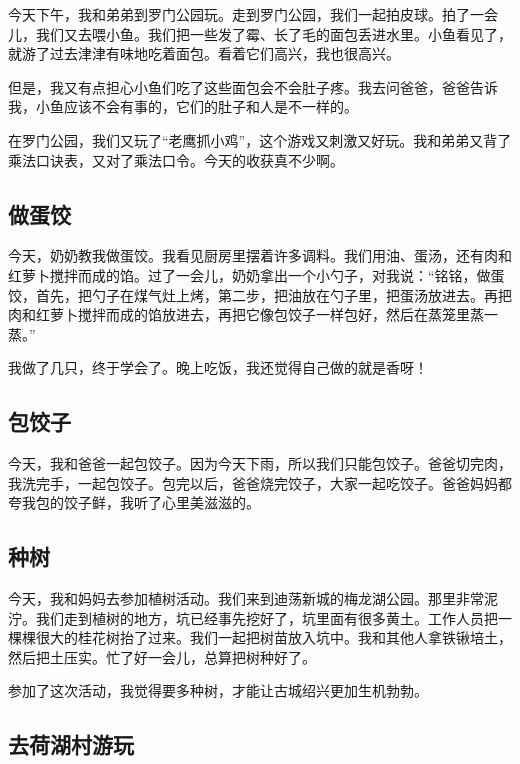 \documentclass[UTF8,a4paper,titlepage,twoside,10.5pt]{article}
\begin{document}
今天下午，我和弟弟到罗门公园玩。走到罗门公园，我们一起拍皮球。拍了一会儿，我们又去喂小鱼。我们把一些发了霉、长了毛的面包丢进水里。小鱼看见了，就游了过去津津有味地吃着面包。看着它们高兴，我也很高兴。

但是，我又有点担心小鱼们吃了这些面包会不会肚子疼。我去问爸爸，爸爸告诉我，小鱼应该不会有事的，它们的肚子和人是不一样的。

在罗门公园，我们又玩了“老鹰抓小鸡”，这个游戏又刺激又好玩。我和弟弟又背了乘法口诀表，又对了乘法口令。今天的收获真不少啊。

\subsection{做蛋饺}
\label{sec:org9515584}

今天，奶奶教我做蛋饺。我看见厨房里摆着许多调料。我们用油、蛋汤，还有肉和红萝卜搅拌而成的馅。过了一会儿，奶奶拿出一个小勺子，对我说：“铭铭，做蛋饺，首先，把勺子在煤气灶上烤，第二步，把油放在勺子里，把蛋汤放进去。再把肉和红萝卜搅拌而成的馅放进去，再把它像包饺子一样包好，然后在蒸笼里蒸一蒸。”

我做了几只，终于学会了。晚上吃饭，我还觉得自己做的就是香呀！

\subsection{包饺子}
\label{sec:org92ec368}

今天，我和爸爸一起包饺子。因为今天下雨，所以我们只能包饺子。爸爸切完肉，我洗完手，一起包饺子。包完以后，爸爸烧完饺子，大家一起吃饺子。爸爸妈妈都夸我包的饺子鲜，我听了心里美滋滋的。

\subsection{种树}
\label{sec:orga864264}

今天，我和妈妈去参加植树活动。我们来到迪荡新城的梅龙湖公园。那里非常泥泞。我们走到植树的地方，坑已经事先挖好了，坑里面有很多黄土。工作人员把一棵棵很大的桂花树抬了过来。我们一起把树苗放入坑中。我和其他人拿铁锹培土，然后把土压实。忙了好一会儿，总算把树种好了。

参加了这次活动，我觉得要多种树，才能让古城绍兴更加生机勃勃。

\subsection{去荷湖村游玩}
\label{sec:org51bc1a8}
\end{document}
